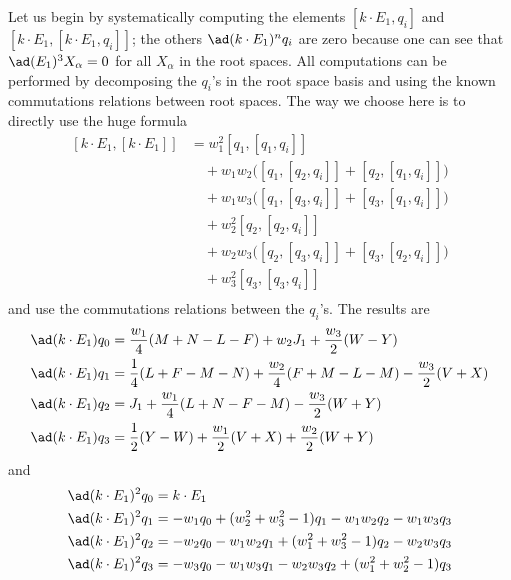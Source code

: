 Let us begin by systematically computing the elements $[k\cdot E_1,q_i]$ and $[k\cdot E_1,[k\cdot E_1,q_i]]$; the others $\ad(k\cdot E_1)^nq_i$ are zero because one can see that $\ad(E_1)^3X_{\alpha}=0$ for all $X_{\alpha}$ in the root spaces. All computations can be performed by decomposing the $q_i$'s in the root space basis and using the known commutations relations between root spaces. The way we choose here is to directly use the huge formula
\begin{equation}
	\begin{split}
		[k\cdot E_1,[k\cdot E_1]] & =w_1^2[q_1,[q_1,q_i]]                                      \\
		                          & \quad +w_1w_2\big(  [q_1,[q_2,q_i]]+[q_2,[q_1,q_i]]  \big) \\
		                          & \quad +w_1w_3\big(  [q_1,[q_3,q_i]]+[q_3,[q_1,q_i]]  \big) \\
		                          & \quad +w_2^2[q_2,[q_2,q_i]]                                \\
		                          & \quad +w_2w_3\big(  [q_2,[q_3,q_i]]+[q_3,[q_2,q_i]]  \big) \\
		                          & \quad +w_3^2[q_3,[q_3,q_i]]                                \\
	\end{split}
\end{equation}
and use the commutations relations between the $q_i$'s. The results are
\begin{equation}
	\begin{split}
		\ad(k\cdot E_1)q_0 & =\frac{w_1}{4}(M+N-L-F)+w_2J_1+\frac{w_3}{2}(W-Y)               \\
		\ad(k\cdot E_1)q_1 & =\frac{1}{4}(L+F-M-N)+\frac{w_2}{4}(F+M-L-M)-\frac{w_3}{2}(V+X) \\
		\ad(k\cdot E_1)q_2 & =J_1+\frac{w_1}{4}(L+N-F-M)-\frac{w_3}{2}(W+Y)                  \\
		\ad(k\cdot E_1)q_3 & =\frac{1}{2}(Y-W)+\frac{w_1}{2}(V+X)+\frac{w_2}{2}(W+Y)         \\
	\end{split}
\end{equation}
and
\begin{equation}
	\begin{split}
		\ad(k\cdot E_1)^2q_0 & =k\cdot E_1                                     \\
		\ad(k\cdot E_1)^2q_1 & =-w_1q_0+(w_2^2+w_3^2-1)q_1-w_1w_2q_2-w_1w_3q_3 \\
		\ad(k\cdot E_1)^2q_2 & =-w_2q_0-w_1w_2q_1+(w_1^2+w_3^2-1)q_2-w_2w_3q_3 \\
		\ad(k\cdot E_1)^2q_3 & =-w_3q_0-w_1w_3q_1-w_2w_3q_2+(w_1^2+w_2^2-1)q_3 \\
	\end{split}
\end{equation}
